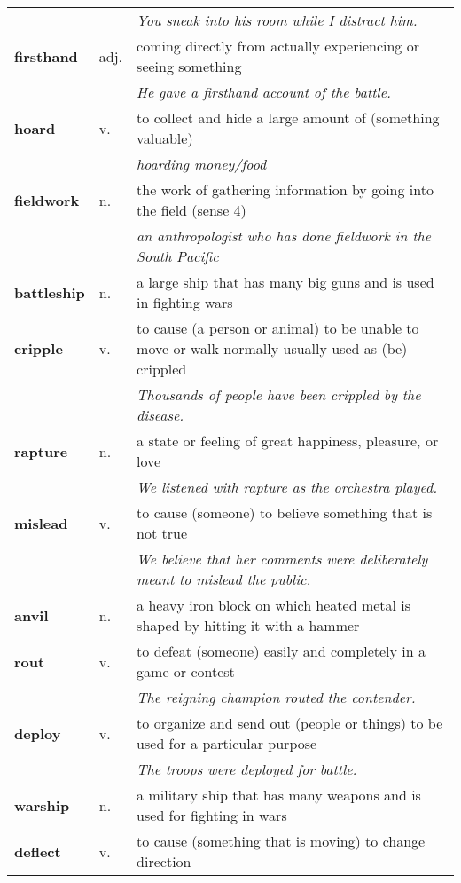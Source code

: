 \documentclass[a4paper]{article}
\begin{document}
\begin{longtable}{llp{11cm}}
 & & \textit{You sneak into his room while I distract him.}\\[0.08cm]
\textbf{firsthand} & adj. &  coming directly from actually experiencing or seeing something \\
 & & \textit{He gave a firsthand account of the battle.}\\[0.08cm]
\textbf{hoard} & v. &  to collect and hide a large amount of (something valuable) \\
 & & \textit{hoarding money/food}\\[0.08cm]
\textbf{fieldwork} & n. &  the work of gathering information by going into the field (sense 4) \\
 & & \textit{an anthropologist who has done fieldwork in the South Pacific}\\[0.08cm]
\textbf{battleship} & n. &  a large ship that has many big guns and is used in fighting wars\\[0.08cm]
\textbf{cripple} & v. &  to cause (a person or animal) to be unable to move or walk normally usually used as (be) crippled \\
 & & \textit{Thousands of people have been crippled by the disease.}\\[0.08cm]
\textbf{rapture} & n. &  a state or feeling of great happiness, pleasure, or love \\
 & & \textit{We listened with rapture as the orchestra played.}\\[0.08cm]
\textbf{mislead} & v. &  to cause (someone) to believe something that is not true \\
 & & \textit{We believe that her comments were deliberately meant to mislead the public.}\\[0.08cm]
\textbf{anvil} & n. &  a heavy iron block on which heated metal is shaped by hitting it with a hammer\\[0.08cm]
\textbf{rout} & v. &  to defeat (someone) easily and completely in a game or contest \\
 & & \textit{The reigning champion routed the contender.}\\[0.08cm]
\textbf{deploy} & v. &  to organize and send out (people or things) to be used for a particular purpose \\
 & & \textit{The troops were deployed for battle.}\\[0.08cm]
\textbf{warship} & n. &  a military ship that has many weapons and is used for fighting in wars\\[0.08cm]
\textbf{deflect} & v. &  to cause (something that is moving) to change direction \\

\end{longtable}
\end{document}
